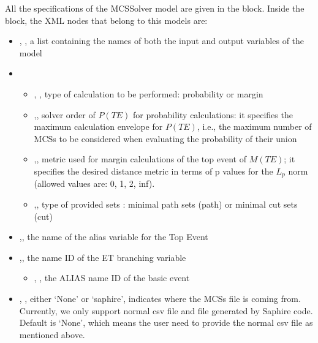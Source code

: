 All the specifications of the MCSSolver model are given in the  block.
Inside the  block, the XML nodes that belong to this models are:
\begin{itemize}
  \item  {}, , a list containing the names of both the input and output variables of the model
  \item  {}
	  \begin{itemize}
	    \item {}, , type of calculation to be performed: probability or margin

        \item {},, solver order of $P(TE)$ for probability calculations: it specifies the
                                                                           maximum calculation envelope for $P(TE)$, i.e., the maximum number of MCSs
                                                                           to be considered when evaluating the probability of their union
         \item {},, metric used for margin calculations of the top event of $M(TE)$; it specifies the
                                                                      desired distance metric in terms of p values for the $L_p$ norm (allowed values
                                                                      are: 0, 1, 2, inf). 
          \item {},, type of provided sets : minimal path sets (path) or minimal cut sets (cut)                                                            
      \end{itemize}
  \item  {},, the name of the alias variable for the Top Event
  \item  {},, the name ID of the ET branching variable
	  \begin{itemize}
	    \item {}, , the ALIAS name ID of the basic event
	  \end{itemize}
  \item {}, , either `None' or `saphire', indicates where the MCSs file is coming from. Currently,
  we only support normal csv file and file generated by Saphire code. Default is `None', which means the user need to provide
  the normal csv file as mentioned above.
\end{itemize}

